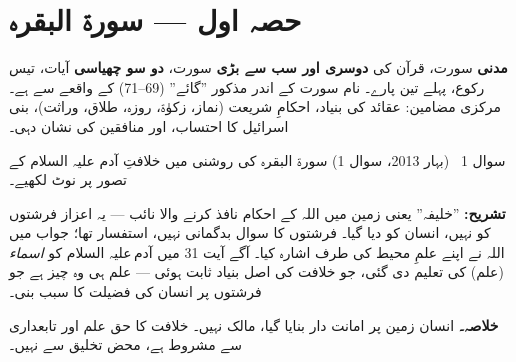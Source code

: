 %

\section*{حصہ اول --- سورۃ البقرہ}

\begin{nukta}
\textbf{مدنی} سورت، قرآن کی \textbf{دوسری اور سب سے بڑی} سورت، \textbf{دو سو
چھیاسی} آیات، تیس رکوع، پہلے تین پارے۔ نام سورت کے اندر مذکور ''گائے''
(\textenglish{69--71}) کے واقعے سے ہے۔ مرکزی مضامین: عقائد کی بنیاد، احکامِ
شریعت (نماز، زکوٰۃ، روزہ، طلاق، وراثت)، بنی اسرائیل کا احتساب، اور منافقین کی
نشان دہی۔
\end{nukta}

\begin{sawal}{سوال \textenglish{1} \ \textnormal{\small(بہار \textenglish{2013}، سوال \textenglish{1})}}
سورۃ البقرہ کی روشنی میں خلافتِ آدم علیہ السلام کے تصور پر نوٹ لکھیے۔
\end{sawal}

\begin{hal}

\smallskip
\textbf{تشریح:} ''خلیفہ'' یعنی زمین میں اللہ کے احکام نافذ کرنے والا نائب ---
یہ اعزاز فرشتوں کو نہیں، انسان کو دیا گیا۔ فرشتوں کا سوال بدگمانی نہیں،
استفسار تھا؛ جواب میں اللہ نے اپنے علمِ محیط کی طرف اشارہ کیا۔ آگے آیت
\textenglish{31} میں آدم\,علیہ السلام کو \emph{اسماء} (علم) کی تعلیم دی گئی،
جو خلافت کی اصل بنیاد ثابت ہوئی --- علم ہی وہ چیز ہے جو فرشتوں پر انسان کی
فضیلت کا سبب بنی۔

\medskip
\textbf{خلاصہ۔} انسان زمین پر امانت دار بنایا گیا، مالک نہیں۔ خلافت کا حق
علم اور تابعداری سے مشروط ہے، محض تخلیق سے نہیں۔
\end{hal}

